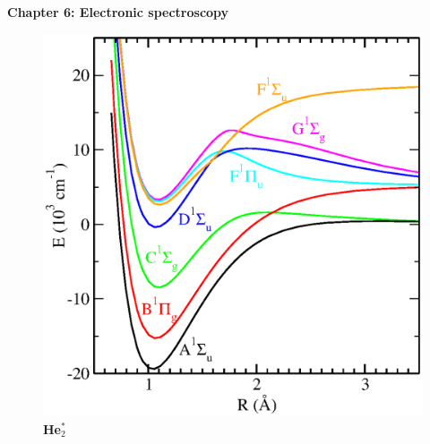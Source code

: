 \renewcommand{\theequation}{6.\arabic{equation}}

\begin{frame}
\begin{center}
{\bf Chapter 6: Electronic spectroscopy}\\
\end{center}

\vspace*{0.2cm}

\begin{figure}
\centering
\includegraphics[scale=0.3]{figs/he2-singlet}\\
\hspace{0.8cm}\textbf{He$_2^*$}
\end{figure}
\end{frame}

\scriptsize










